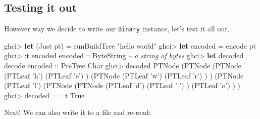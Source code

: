 \documentclass[]{article}
\newenvironment{Shaded}{\begin{snugshade}}{\end{snugshade}}
\newcommand{\CharTok}[1]{\textcolor[rgb]{0.31,0.60,0.02}{#1}}
\newcommand{\CommentTok}[1]{\textcolor[rgb]{0.56,0.35,0.01}{\textit{#1}}}
\newcommand{\DataTypeTok}[1]{\textcolor[rgb]{0.13,0.29,0.53}{#1}}
\newcommand{\FunctionTok}[1]{\textcolor[rgb]{0.00,0.00,0.00}{#1}}
\newcommand{\KeywordTok}[1]{\textcolor[rgb]{0.13,0.29,0.53}{\textbf{#1}}}
\newcommand{\NormalTok}[1]{#1}
\newcommand{\OtherTok}[1]{\textcolor[rgb]{0.56,0.35,0.01}{#1}}
\newcommand{\StringTok}[1]{\textcolor[rgb]{0.31,0.60,0.02}{#1}}
\begin{document}
\hypertarget{testing-it-out}{%
\subsection{Testing it out}\label{testing-it-out}}

However way we decide to write our \texttt{Binary} instance, let's test it all
out.

\begin{Shaded}
\begin{Highlighting}[]
\NormalTok{ghci}\FunctionTok{>} \KeywordTok{let}\NormalTok{ (}\DataTypeTok{Just}\NormalTok{ pt) }\FunctionTok{=}\NormalTok{ runBuildTree }\StringTok{"hello world"}
\NormalTok{ghci}\FunctionTok{>} \KeywordTok{let}\NormalTok{ encoded }\FunctionTok{=}\NormalTok{ encode pt}
\NormalTok{ghci}\FunctionTok{>} \FunctionTok{:}\NormalTok{t encoded}
\OtherTok{encoded ::} \DataTypeTok{ByteString}       \CommentTok{-- a string of bytes}
\NormalTok{ghci}\FunctionTok{>} \KeywordTok{let}\NormalTok{ decoded }\FunctionTok{=}\NormalTok{ decode}\OtherTok{ encoded ::} \DataTypeTok{PreTree} \DataTypeTok{Char}
\NormalTok{ghci}\FunctionTok{>}\NormalTok{ decoded}
\DataTypeTok{PTNode}\NormalTok{ (}\DataTypeTok{PTNode}\NormalTok{ (}\DataTypeTok{PTNode}\NormalTok{ (}\DataTypeTok{PTLeaf} \CharTok{'h'}\NormalTok{)}
\NormalTok{                       (}\DataTypeTok{PTLeaf} \CharTok{'e'}\NormalTok{)}
\NormalTok{               )}
\NormalTok{               (}\DataTypeTok{PTNode}\NormalTok{ (}\DataTypeTok{PTLeaf} \CharTok{'w'}\NormalTok{)}
\NormalTok{                       (}\DataTypeTok{PTLeaf} \CharTok{'r'}\NormalTok{)}
\NormalTok{               )}
\NormalTok{       )}
\NormalTok{       (}\DataTypeTok{PTNode}\NormalTok{ (}\DataTypeTok{PTLeaf} \CharTok{'l'}\NormalTok{)}
\NormalTok{               (}\DataTypeTok{PTNode}\NormalTok{ (}\DataTypeTok{PTNode}\NormalTok{ (}\DataTypeTok{PTLeaf} \CharTok{'d'}\NormalTok{)}
\NormalTok{                               (}\DataTypeTok{PTLeaf} \CharTok{' '}\NormalTok{)}
\NormalTok{                       )}
\NormalTok{                       (}\DataTypeTok{PTLeaf} \CharTok{'o'}\NormalTok{)}
\NormalTok{               )}
\NormalTok{       )}
\NormalTok{ghci}\FunctionTok{>}\NormalTok{ decoded }\FunctionTok{==}\NormalTok{ t}
\DataTypeTok{True}
\end{Highlighting}
\end{Shaded}

Neat! We can also write it to a file and re-read:
\end{document}
